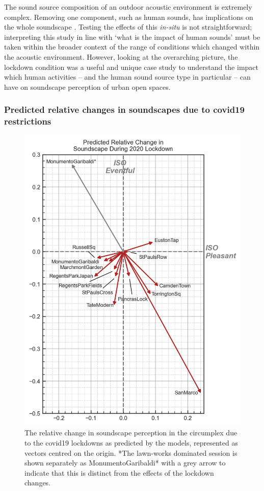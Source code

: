    The sound source composition of an outdoor acoustic environment is extremely complex. Removing one component, such as human sounds, has implications on the whole soundscape \citep{Gordo2021Rapid}. Testing the effects of this \emph{in-situ} is not straightforward; interpreting this study in line with `what is the impact of human sounds' must be taken within the broader context of the range of conditions which changed within the acoustic environment. However, looking at the overarching picture, the lockdown condition was a useful and unique case study to understand the impact which human activities -- and the human sound source type in particular -- can have on soundscape perception of urban open spaces.

   \subsubsection{Predicted relative changes in soundscapes due to \gls{covid19} restrictions}


   \begin{figure}[!h]
    \centering
    \includegraphics[width=.75\textwidth]{Figures/Lockdown Figure6.jpg}
    \caption{The relative change in soundscape perception in the circumplex due to the \gls{covid19} lockdowns as predicted by the models, represented as vectors centred on the origin. *The lawn-works dominated session is shown separately as MonumentoGaribaldi* with a grey arrow to indicate that this is distinct from the effects of the lockdown changes. \label{fig:circumplex-vectors}}

   \end{figure}

